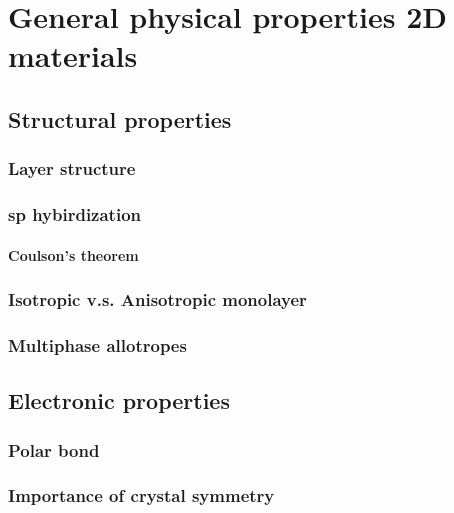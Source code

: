 
\chapter{General physical properties 2D materials \label{chap:3}}

\ifpdf
    \graphicspath{{Chapter3/Figs/Raster/}{Chapter3/Figs/PDF/}{Chapter3/Figs/}{Chapter3/Figs/Vector/}}
\else
    \graphicspath{{Chapter3/Figs/Vector/}{Chapter3/Figs/}}
\fi

\section{Structural properties}
\subsection{Layer structure}
\subsection{sp hybirdization}
\subsubsection{Coulson’s theorem}
\subsection{Isotropic v.s. Anisotropic monolayer}
\subsection{Multiphase allotropes}

\section{Electronic properties}
\subsection{Polar bond}
\subsection{Importance of crystal symmetry}

